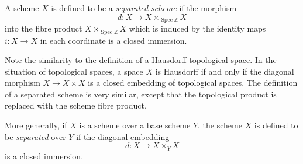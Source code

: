 \documentclass[12pt]{article}
\newcommand{\Z}{\mathbb{Z}}
\newcommand{\lra}{\longrightarrow}
\newcommand{\Spec}{\operatorname{Spec}}
\begin{document}
A scheme $X$ is defined to be a {\em separated scheme} if the morphism
$$
d: X \to X \times_{\Spec\Z} X
$$
into the fibre product $X \times_{\Spec\Z} X$ which is induced by the identity maps $i: X \lra X$ in each coordinate is a closed immersion.

Note the similarity to the definition of a Hausdorff topological space. In the situation of topological spaces, a space $X$ is Hausdorff if and only if the diagonal morphism $X \lra X \times X$ is a closed embedding of topological spaces. The definition of a separated scheme is very similar, except that the topological product is replaced with the scheme fibre product.

More generally, if $X$ is a scheme over a base scheme $Y$, the scheme $X$ is defined to be \emph{separated} over $Y$ if the diagonal embedding
$$
d: X \to X \times_{Y} X
$$
is a closed immersion.
\end{document}
